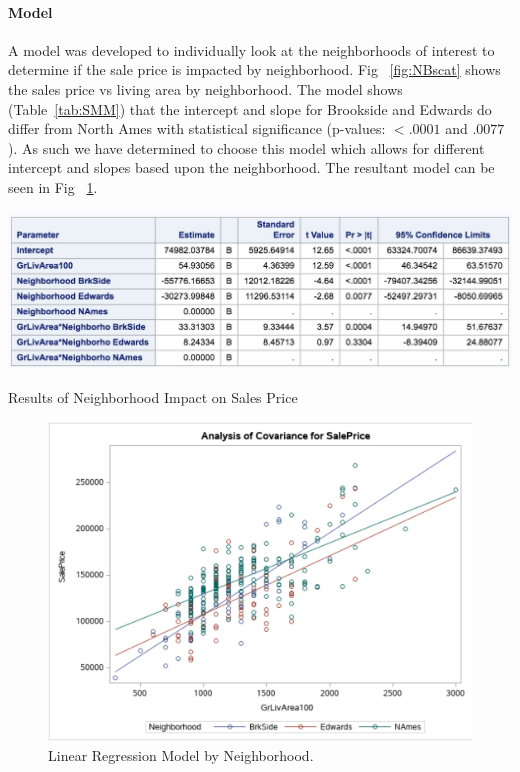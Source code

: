 \documentclass[11pt]{scrartcl} %
\begin{document}
\paragraph{Model} A model was developed to individually look at the neighborhoods of interest to determine if the sale price is impacted by neighborhood. Fig ~\ref{fig:NBscat} shows the sales price vs living area by neighborhood. The model shows (Table~\ref{tab:SMM}) that the intercept and slope for Brookside and Edwards do differ from North Ames with statistical significance (p-values: $<.0001$ and $.0077$). As such we have determined to choose this model which allows for different intercept and slopes based upon the neighborhood. The resultant model can be seen in Fig ~\ref{fig:NBLRM}.
\begin{table}[h] %
	\centering %
	\includegraphics[scale=.3]{../graphics/A1NHcomp}
	\caption{Results of Neighborhood Impact on Sales Price}
	\label{tab:SMM}
\end{table}

\begin{figure}[h] %
	\centering
	\includegraphics[scale=.2]{../graphics/A1NBMLR}
	\caption{Linear Regression Model by Neighborhood.}
	\label{fig:NBLRM}
\end{figure}
\end{document}

